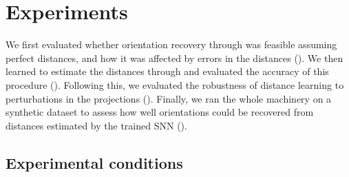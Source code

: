 \section{Experiments}\label{sec:experiments}


We first evaluated whether orientation recovery through  was feasible assuming perfect distances, and how it was affected by errors in the distances ().
We then learned to estimate the distances through  and evaluated the accuracy of this procedure ().
Following this, we evaluated the robustness of distance learning to perturbations in the projections ().
Finally, we ran the whole machinery on a synthetic dataset to assess how well orientations could be recovered from distances estimated by the trained SNN ().


\subsection{Experimental conditions}\label{sec:results:data}

